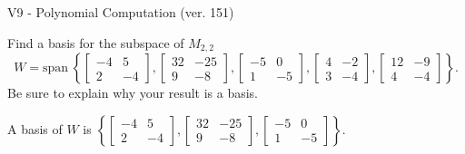\begin{exercise}
  \begin{exerciseTitle}V9 - Polynomial Computation (ver. 151)\end{exerciseTitle}
  \begin{exerciseStatement}
    Find a basis for the subspace of \(M_{2,2}\) 
\[W=\mathrm{span}\ \left\{\left[\begin{array}{cc}
-4 & 5 \\
2 & -4
\end{array}\right] , \left[\begin{array}{cc}
32 & -25 \\
9 & -8
\end{array}\right] , \left[\begin{array}{cc}
-5 & 0 \\
1 & -5
\end{array}\right] , \left[\begin{array}{cc}
4 & -2 \\
3 & -4
\end{array}\right] , \left[\begin{array}{cc}
12 & -9 \\
4 & -4
\end{array}\right]\right\}.\]
 Be sure to explain why your result is a basis.


  \end{exerciseStatement}
  \begin{exerciseAnswer}
   A basis of \(W\) is  \(\left\{\left[\begin{array}{cc}
-4 & 5 \\
2 & -4
\end{array}\right] , \left[\begin{array}{cc}
32 & -25 \\
9 & -8
\end{array}\right] , \left[\begin{array}{cc}
-5 & 0 \\
1 & -5
\end{array}\right]\right\}\).
  


  \end{exerciseAnswer}
\end{exercise}